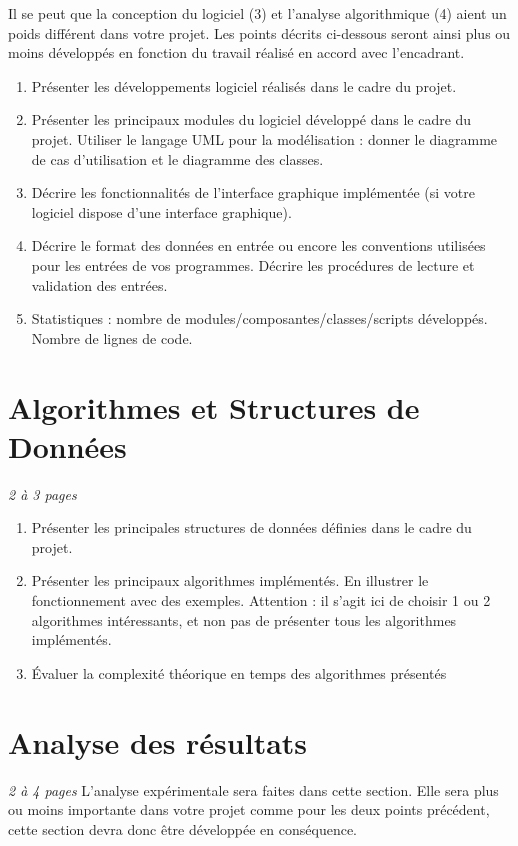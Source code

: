 \documentclass[a4paper]{article} %
\begin{document}
Il se peut que la conception du logiciel (3) et l'analyse algorithmique (4) aient un poids différent dans votre projet. Les points décrits ci-dessous seront ainsi plus ou moins développés en fonction du travail réalisé en accord avec l'encadrant. 
\begin{enumerate}%
\item Présenter les développements logiciel réalisés dans le cadre du projet.
\item Présenter les principaux modules du logiciel développé dans le cadre du projet. Utiliser le langage UML pour la modélisation : donner le diagramme de cas d'utilisation et le diagramme des classes.
\item Décrire les fonctionnalités de l'interface graphique implémentée (si votre logiciel dispose d'une interface graphique).
\item Décrire le format des données en entrée ou encore les conventions utilisées pour les entrées de vos programmes. Décrire les procédures de lecture et validation des entrées.
\item Statistiques : nombre de modules/composantes/classes/scripts développés. Nombre de lignes de code.
\end{enumerate}

\section{Algorithmes et Structures de Données}
\emph{2 à 3 pages}
\begin{enumerate}%
\item 	Présenter les principales structures de données définies dans le cadre du projet.
\item 	Présenter les principaux algorithmes implémentés. En illustrer le fonctionnement avec des exemples. Attention : il s'agit ici de choisir 1 ou 2 algorithmes intéressants, et non pas de présenter tous les algorithmes implémentés.
\item 	Évaluer la complexité théorique en temps des algorithmes présentés
\end{enumerate}

\section{Analyse des résultats }
\emph{2 à 4 pages}
L'analyse expérimentale sera faites dans cette section.   Elle sera plus ou moins importante dans votre projet comme pour les deux points précédent, cette section devra donc être développée en conséquence.
\end{document}
